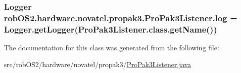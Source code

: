 \label{classrob_o_s2_1_1hardware_1_1novatel_1_1propak3_1_1_pro_pak3_listener_af0ae51bcf619aff7d2b364bc43bff319}
\hypertarget{classrob_o_s2_1_1hardware_1_1novatel_1_1propak3_1_1_pro_pak3_listener_a565ec13051b6c6e2f12212c399e75378}{
\subsubsection[{log}]{\setlength{\rightskip}{0pt plus 5cm}Logger {\bf robOS2.hardware.novatel.propak3.ProPak3Listener.log} = Logger.getLogger(ProPak3Listener.class.getName())}}
\label{classrob_o_s2_1_1hardware_1_1novatel_1_1propak3_1_1_pro_pak3_listener_a565ec13051b6c6e2f12212c399e75378}


The documentation for this class was generated from the following file:\begin{DoxyCompactItemize}
\item 
src/robOS2/hardware/novatel/propak3/\hyperlink{_pro_pak3_listener_8java}{ProPak3Listener.java}\end{DoxyCompactItemize}
